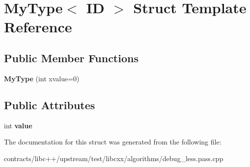 \hypertarget{struct_my_type}{}\section{My\+Type$<$ ID $>$ Struct Template Reference}
\label{struct_my_type}
\subsection*{Public Member Functions}
\begin{DoxyCompactItemize}
\item 
\mbox{\label{struct_my_type_a274a0ea01e101698cd0f4488f6198e3b}} 
{\bfseries My\+Type} (int xvalue=0)
\end{DoxyCompactItemize}
\subsection*{Public Attributes}
\begin{DoxyCompactItemize}
\item 
\mbox{\label{struct_my_type_a7074e4784b764b64e4eab78337aa2493}} 
int {\bfseries value}
\end{DoxyCompactItemize}


The documentation for this struct was generated from the following file\+:\begin{DoxyCompactItemize}
\item 
contracts/libc++/upstream/test/libcxx/algorithms/debug\+\_\+less.\+pass.\+cpp\end{DoxyCompactItemize}
